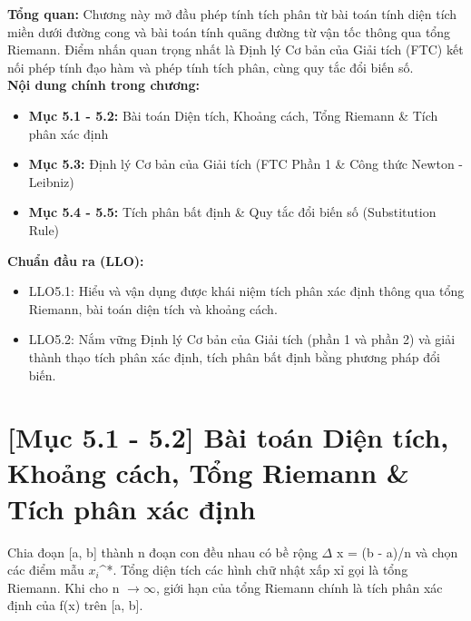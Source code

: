 \documentclass[11pt,a4paper,oneside]{book}
\begin{document}
\begin{tcolorbox}[colback=slate!5!white,colframe=slate!75!black,title={\textbf{Mục lục Chương 5 \& Chuẩn đầu ra (Buổi 5)}}]
\textbf{Tổng quan:} Chương này mở đầu phép tính tích phân từ bài toán tính diện tích miền dưới đường cong và bài toán tính quãng đường từ vận tốc thông qua tổng Riemann. Điểm nhấn quan trọng nhất là Định lý Cơ bản của Giải tích (FTC) kết nối phép tính đạo hàm và phép tính tích phân, cùng quy tắc đổi biến số.\\[6pt]
\textbf{Nội dung chính trong chương:}
\begin{itemize}[leftmargin=1.5em, itemsep=2pt]
  \item \textbf{Mục 5.1 - 5.2:} Bài toán Diện tích, Khoảng cách, Tổng Riemann \& Tích phân xác định
  \item \textbf{Mục 5.3:} Định lý Cơ bản của Giải tích (FTC Phần 1 \& Công thức Newton - Leibniz)
  \item \textbf{Mục 5.4 - 5.5:} Tích phân bất định \& Quy tắc đổi biến số (Substitution Rule)
\end{itemize}
\textbf{Chuẩn đầu ra (LLO):}
\begin{itemize}[leftmargin=1.5em, itemsep=2pt]
  \item LLO5.1: Hiểu và vận dụng được khái niệm tích phân xác định thông qua tổng Riemann, bài toán diện tích và khoảng cách.
  \item LLO5.2: Nắm vững Định lý Cơ bản của Giải tích (phần 1 và phần 2) và giải thành thạo tích phân xác định, tích phân bất định bằng phương pháp đổi biến.
\end{itemize}
\end{tcolorbox}

\section{[Mục 5.1 - 5.2] Bài toán Diện tích, Khoảng cách, Tổng Riemann \& Tích phân xác định}
Chia đoạn [a, b] thành n đoạn con đều nhau có bề rộng $\Delta$ x = (b - a)/n và chọn các điểm mẫu $x_i$\^{}*. Tổng diện tích các hình chữ nhật xấp xỉ gọi là tổng Riemann. Khi cho n $\to \infty$, giới hạn của tổng Riemann chính là tích phân xác định của f(x) trên [a, b].
\end{document}
